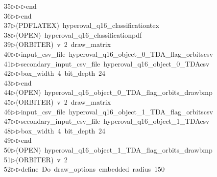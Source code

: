 \begin{tabbing}
35\>$\triangleright$\>$\triangleright$\>$\triangleright$\>end\ \\[0pt]
36\>$\triangleright$\>$\triangleright$\>end\\[0pt]
37\>$\triangleright$\>(PDFLATEX)\ hyperoval\_q16\_classificationtex\\[0pt]
38\>$\triangleright$\>(OPEN)\ hyperoval\_q16\_classificationpdf\\[0pt]
39\>$\triangleright$\>(ORBITER)\ v\ 2\ draw\_matrix\ \\[0pt]
40\>$\triangleright$\>$\triangleright$\>input\_csv\_file\ hyperoval\_q16\_object\_0\_TDA\_flag\_orbitscsv\ \\[0pt]
41\>$\triangleright$\>$\triangleright$\>secondary\_input\_csv\_file\ hyperoval\_q16\_object\_0\_TDAcsv\ \\[0pt]
42\>$\triangleright$\>$\triangleright$\>box\_width\ 4\ bit\_depth\ 24\ \\[0pt]
43\>$\triangleright$\>$\triangleright$\>end\\[0pt]
44\>$\triangleright$\>(OPEN)\ hyperoval\_q16\_object\_0\_TDA\_flag\_orbits\_drawbmp\\[0pt]
45\>$\triangleright$\>(ORBITER)\ v\ 2\ draw\_matrix\ \\[0pt]
46\>$\triangleright$\>$\triangleright$\>input\_csv\_file\ hyperoval\_q16\_object\_1\_TDA\_flag\_orbitscsv\ \\[0pt]
47\>$\triangleright$\>$\triangleright$\>secondary\_input\_csv\_file\ hyperoval\_q16\_object\_1\_TDAcsv\ \\[0pt]
48\>$\triangleright$\>$\triangleright$\>box\_width\ 4\ bit\_depth\ 24\ \\[0pt]
49\>$\triangleright$\>$\triangleright$\>end\\[0pt]
50\>$\triangleright$\>(OPEN)\ hyperoval\_q16\_object\_1\_TDA\_flag\_orbits\_drawbmp\\[0pt]
51\>$\triangleright$\>(ORBITER)\ v\ 2\ \\[0pt]
52\>$\triangleright$\>$\triangleright$\>define\ Do\ draw\_options\ embedded\ radius\ 150\ \\[0pt]

\end{tabbing}
